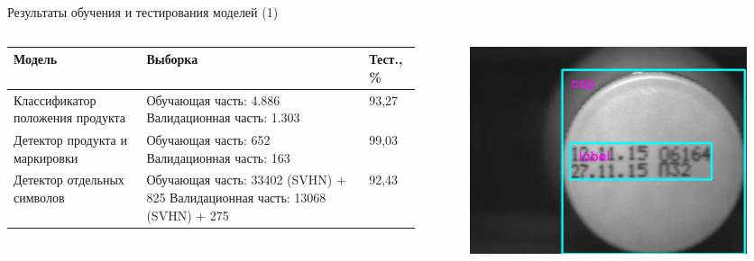 \documentclass[10pt]{beamer}
\begin{document}
        \begin{frame}{Результаты обучения и тестирования моделей (1)}
            \begin{columns}
                \begin{column}{0.55\textwidth}
                    \begin{table}
                        \centering
                        \begin{tabular}{| p{2.3cm} | p{2.3cm} | p{1cm} | }
                          \hline
                            \textbf{Модель} & 
                            \textbf{Выборка} & \textbf{Тест., \%}\\
                            \hline
                            Классификатор положения продукта & Обучающая часть: 4.886\newline
                            Валидационная часть: 
                            1.303 & 93,27\\
                            \hline
                            Детектор продукта и маркировки & Обучающая часть:
                            652\newline
                            Валидационная часть:
                            163 & 99,03\\
                            \hline
                            Детектор отдельных символов & Обучающая часть:
                            33402 (SVHN) + 825\newline
                            Валидационная часть:
                            13068 (SVHN) + 275 & 92,43\\
                            \hline
                        \end{tabular}
                    \end{table}  
                \end{column}
                \begin{column}{0.45\textwidth}
                    \begin{figure}
                        \centering
                        \includegraphics[width=\textwidth]{pic4-25.png}

\end{figure}
\end{column}
\end{columns}
\end{frame}
\end{document}
